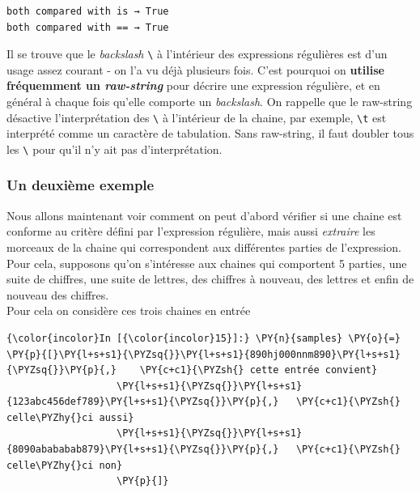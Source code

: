     \begin{Verbatim}[commandchars=\\\{\}]
both compared with is → True
both compared with == → True

    \end{Verbatim}

    Il se trouve que le \emph{backslash} \texttt{\textbackslash{}} à
l'intérieur des expressions régulières est d'un usage assez courant - on
l'a vu déjà plusieurs fois. C'est pourquoi on \textbf{utilise
fréquemment un \emph{raw-string}} pour décrire une expression régulière,
et en général à chaque fois qu'elle comporte un \emph{backslash}. On
rappelle que le raw-string désactive l'interprétation des
\texttt{\textbackslash{}} à l'intérieur de la chaine, par exemple,
\texttt{\textbackslash{}t} est interprété comme un caractère de
tabulation. Sans raw-string, il faut doubler tous les
\texttt{\textbackslash{}} pour qu'il n'y ait pas d'interprétation.

    \hypertarget{un-deuxiuxe8me-exemple}{%
\subsubsection{Un deuxième exemple}\label{un-deuxiuxe8me-exemple}}

    Nous allons maintenant voir comment on peut d'abord vérifier si une
chaine est conforme au critère défini par l'expression régulière, mais
aussi \emph{extraire} les morceaux de la chaine qui correspondent aux
différentes parties de l'expression.\\

Pour cela, supposons qu'on s'intéresse aux chaines qui comportent 5
parties, une suite de chiffres, une suite de lettres, des chiffres à
nouveau, des lettres et enfin de nouveau des chiffres.\\

    Pour cela on considère ces trois chaines en entrée

    \begin{Verbatim}[commandchars=\\\{\}]
{\color{incolor}In [{\color{incolor}15}]:} \PY{n}{samples} \PY{o}{=} \PY{p}{[}\PY{l+s+s1}{\PYZsq{}}\PY{l+s+s1}{890hj000nnm890}\PY{l+s+s1}{\PYZsq{}}\PY{p}{,}    \PY{c+c1}{\PYZsh{} cette entrée convient}
                   \PY{l+s+s1}{\PYZsq{}}\PY{l+s+s1}{123abc456def789}\PY{l+s+s1}{\PYZsq{}}\PY{p}{,}   \PY{c+c1}{\PYZsh{} celle\PYZhy{}ci aussi}
                   \PY{l+s+s1}{\PYZsq{}}\PY{l+s+s1}{8090abababab879}\PY{l+s+s1}{\PYZsq{}}\PY{p}{,}   \PY{c+c1}{\PYZsh{} celle\PYZhy{}ci non}
                   \PY{p}{]}
\end{Verbatim}


